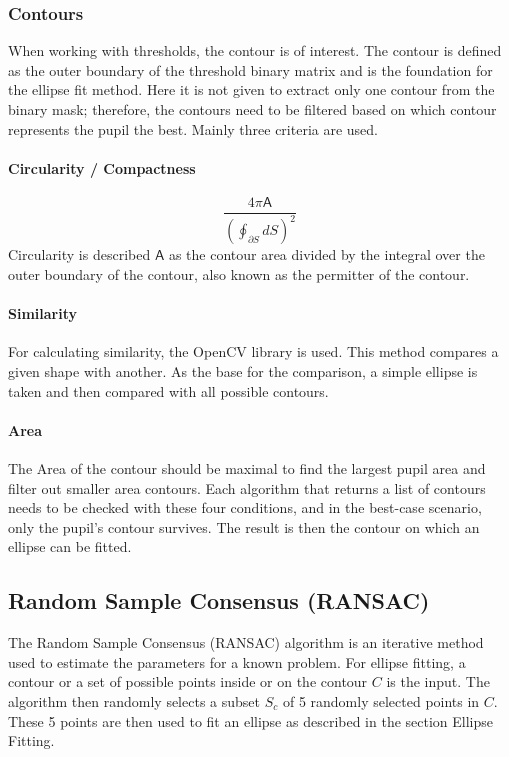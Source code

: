\subsubsection{Contours}
When working with thresholds, the contour is of interest. The contour is defined as the outer boundary of the threshold binary matrix and is the foundation for the ellipse fit method. 
Here it is not given to extract only one contour from the binary mask; therefore, the contours need to be filtered based on which contour represents the pupil the best. 
Mainly three criteria are used. 

\paragraph{Circularity / Compactness}
\begin{equation}
    \frac{4\pi\mathsf{A} }{(\oint_{\partial S} dS)^2}
\end{equation}
Circularity is described $\mathsf{A} $ as the contour area divided by the integral over the outer boundary of the contour, also known as the permitter of the contour.

\paragraph{Similarity }
For calculating similarity, the OpenCV library is used. This method compares a given shape with another. As the base for the comparison, a simple ellipse is taken and then compared with all possible contours.

\paragraph{Area}
The Area of the contour should be maximal to find the largest pupil area and filter out smaller area contours. 
Each algorithm that returns a list of contours needs to be checked with these four conditions, and in the best-case scenario, only the pupil's contour survives. The result is then the contour on which an ellipse can be fitted. 
\newpage
\subsection{Random Sample Consensus (RANSAC) }
\label{sus:ransac}
The Random Sample Consensus (RANSAC)\cite{derpanis_overview_nodate} algorithm is an iterative method used to estimate the parameters for a known problem. For ellipse fitting, a contour or a set of possible points inside or on the contour $C$ is the input. The algorithm then randomly selects a subset $S_c$ of 5 randomly selected points in $C$. 
These 5 points are then used to fit an ellipse as described in the section Ellipse Fitting.

